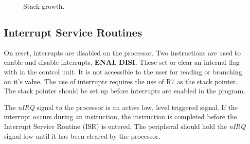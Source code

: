 \begin{figure}[!htb]
	\centering
	\caption{Stack growth.}
	\label{fig:stack}
\end{figure}




\subsection{Interrupt Service Routines}

On reset, interrupts are disabled on the \samurai{} processor.
Two instructions are used to enable and disable interrupts, \textbf{ENAI}, \textbf{DISI}.
These set or clear an internal flag with in the control unit. 
It is not accessible to the user for reading or branching on it's value.
The use of interrupts requires the use of R7 as the stack pointer. 
The stack pointer should be set up before interrupts are enabled in the program.

The \textit{nIRQ} signal to the \samurai{} processor is an active low, level triggered signal.
If the interrupt occurs during an instruction, the instruction is completed before the Interrupt Service Routine (ISR) is entered.
The peripheral should hold the \textit{nIRQ} signal low until it has been cleared by the processor.

